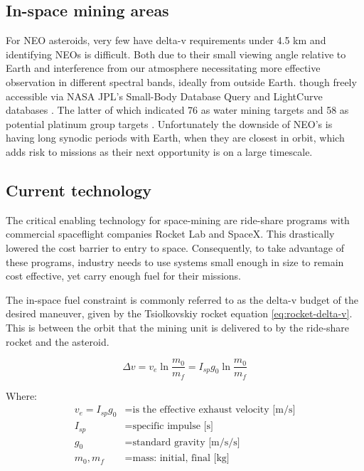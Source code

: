 \documentclass[conference]{IEEEtran}
\begin{document}
\subsection{In-space mining areas}\label{subsec:areas}
For NEO asteroids, very few have delta-v requirements under 4.5 km \cite{Elvis20111408} and identifying NEOs is difficult. Both due to their small viewing angle relative to Earth and interference from our atmosphere necessitating more effective observation in different spectral bands, ideally from outside Earth. though freely accessible via NASA JPL's Small-Body Database Query \cite{small-body-database-jpl} and LightCurve databases \cite{lightcurve-db}. The latter of which indicated 76 as water mining targets and 58 as potential platinum group targets \cite{Xie2023}. Unfortunately the downside of NEO's is having long synodic periods with Earth, when they are closest in orbit, which adds risk to missions as their next opportunity is on a large timescale.

\subsection{Current technology}\label{subsec:tech}
The critical enabling technology for space-mining are ride-share programs with commercial spaceflight companies Rocket Lab and SpaceX. This drastically lowered the cost barrier to entry to space. Consequently, to take advantage of these programs, industry needs to use systems small enough in size to remain cost effective, yet carry enough fuel for their missions.

The in-space fuel constraint is commonly referred to as the delta-v budget of the desired maneuver, given by the Tsiolkovskiy rocket equation \ref{eq:rocket-delta-v}\cite{tsiolkovskiy-1954}. This is between the orbit that the mining unit is delivered to by the ride-share rocket and the asteroid. 

\begin{equation}\label{eq:rocket-delta-v}
    \Delta v = v_e \ln{\frac{m_0}{m_f}} = I_{sp} g_0 \ln{\frac{m_0}{m_f}}
\end{equation}

Where:
\begin{align*}
    v_e = I_{sp} g_0 &= \text{is the effective exhaust velocity [m/s]} \\
    I_{sp} &= \text{specific impulse [s]} \\
    g_0 &= \text{standard gravity [m/s/s]} \\
    m_0, m_f &= \text{mass: initial, final [kg]}
\end{align*}
\end{document}

